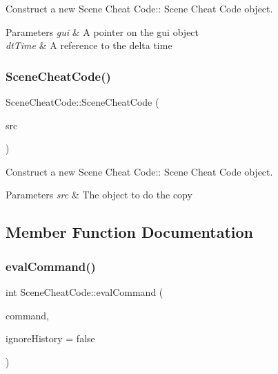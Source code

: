Construct a new Scene Cheat Code\+:\+: Scene Cheat Code object. 


\begin{DoxyParams}{Parameters}
{\em gui} & A pointer on the gui object \\
\hline
{\em dt\+Time} & A reference to the delta time \\
\hline
\end{DoxyParams}
\mbox{\label{class_scene_cheat_code_a9783a5dc52bea32ff3f493755d30d97a}} 
\subsubsection{\texorpdfstring{Scene\+Cheat\+Code()}{SceneCheatCode()}\hspace{0.1cm}{\footnotesize\ttfamily [2/2]}}
{\footnotesize\ttfamily Scene\+Cheat\+Code\+::\+Scene\+Cheat\+Code (\begin{DoxyParamCaption}\item[{\hyperlink{class_scene_cheat_code}{Scene\+Cheat\+Code} const \&}]{src }\end{DoxyParamCaption})}



Construct a new Scene Cheat Code\+:\+: Scene Cheat Code object. 


\begin{DoxyParams}{Parameters}
{\em src} & The object to do the copy \\
\hline
\end{DoxyParams}


\subsection{Member Function Documentation}
\mbox{\label{class_scene_cheat_code_a8195fdcac7fa062e3c078e502edccddf}} 
\subsubsection{\texorpdfstring{eval\+Command()}{evalCommand()}}
{\footnotesize\ttfamily int Scene\+Cheat\+Code\+::eval\+Command (\begin{DoxyParamCaption}\item[{std\+::string const \&}]{command,  }\item[{bool}]{ignore\+History = {\ttfamily false} }\end{DoxyParamCaption})}



